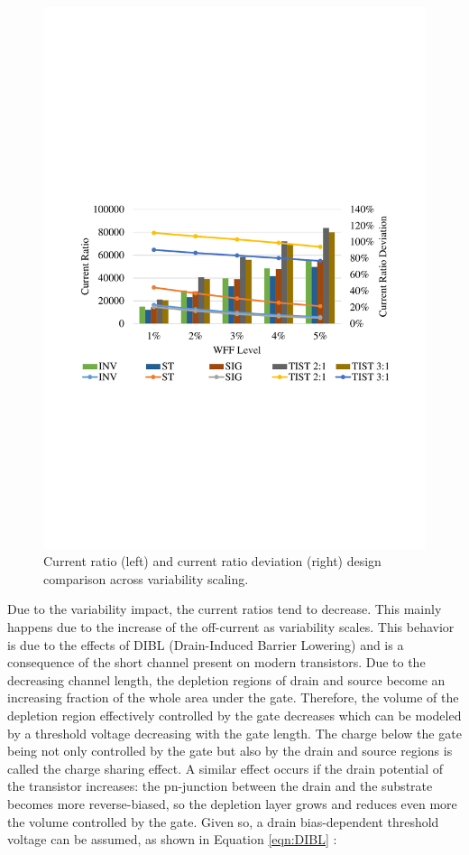 \documentclass[pgmicro,mestrado,english]{iiufrgs}
\begin{document}
    \begin{figure}[]
        \centering
            \includegraphics[width=1\textwidth, trim={1.25cm 9cm 2cm 10cm}, clip]{currRatioWFF.pdf}
            \caption{Current ratio (left) and current ratio deviation (right) design comparison across variability scaling.}
        \label{figsCurrComp}
    \end{figure}

    Due to the variability impact, the current ratios tend to decrease. This mainly happens due to the increase of the off-current as variability scales. This behavior is due to the effects of DIBL (Drain-Induced Barrier Lowering) and is a consequence of the short channel present on modern transistors. Due to the decreasing channel length, the depletion regions of drain and source become an increasing fraction of the whole area under the gate. Therefore, the volume of the depletion region effectively controlled by the gate decreases which can be modeled by a threshold voltage decreasing with the gate length. The charge below the gate being not only controlled by the gate but also by the drain and source regions is called the charge sharing effect. A similar effect occurs if the drain potential of the transistor increases: the pn-junction between the drain and the substrate becomes more reverse-biased, so the depletion layer grows and reduces even more the volume controlled by the gate. Given so, a drain bias-dependent threshold voltage can be assumed, as shown in Equation \ref{eqn:DIBL} \cite{henzler2006power}:
\end{document}
